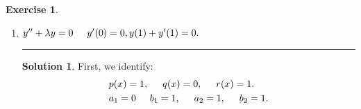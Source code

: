 \documentclass{article}
\theoremstyle{definition}
\newtheorem*{exer*}{Exercise}
\newtheorem*{sln*}{Solution}
\begin{document}
\begin{exer*}
\begin{enumerate}
		\newpage
		
		
		\item $y'' + \lambda y = 0\hspace{0.5cm} y'(0) = 0, y(1) + y'(1) = 0. $\\
		\noindent\rule{\textwidth}{0.5pt}
		\begin{sln*}
			First, we identify:
			\begin{align*}
			&p(x) = 1,\hspace{0.5cm} q(x) = 0,\hspace{0.5cm} r(x) = 1.\\
			&a_1 = 0\hspace{0.5cm} b_1 = 1,\hspace{0.5cm}a_2 = 1,\hspace{0.5cm} b_2 = 1.
			\end{align*}
			

\end{sln*}
\end{enumerate}
\end{exer*}
\end{document}
